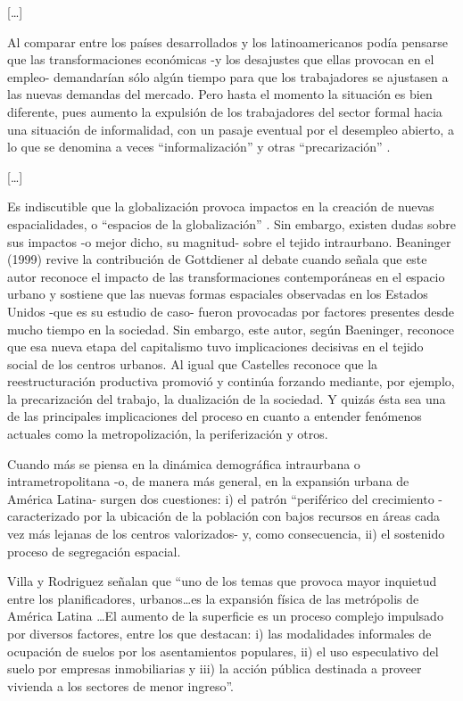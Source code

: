   [\ldots]

  Al comparar entre los países desarrollados y los latinoamericanos podía pensarse que las
  transformaciones económicas -y los desajustes que ellas provocan en el empleo- demandarían sólo
  algún tiempo para que los trabajadores se ajustasen a las nuevas demandas del mercado. Pero hasta el
  momento la situación es bien diferente, pues aumento la expulsión de los trabajadores del sector
  formal hacia una situación de informalidad, con un pasaje eventual por el desempleo abierto, a lo
  que se denomina a veces ``informalización'' y otras ``precarización'' \cite{Ded99}.

  [\ldots]

  Es indiscutible que la globalización provoca impactos en la creación de nuevas espacialidades, o
  ``espacios de la globalización'' \cite{Bae99}. Sin embargo, existen dudas sobre sus impactos -o
  mejor dicho, su magnitud- sobre el tejido intraurbano. Beaninger (1999) revive la contribución de
  Gottdiener al debate cuando señala que este autor reconoce el impacto de las transformaciones
  contemporáneas en el espacio urbano y sostiene que las nuevas formas espaciales observadas en los
  Estados Unidos -que es su estudio de caso- fueron provocadas por factores presentes desde mucho
  tiempo en la sociedad. Sin embargo, este autor, según Baeninger, reconoce que esa nueva etapa del
  capitalismo tuvo implicaciones decisivas en el tejido social de los centros urbanos. Al igual que
  Castelles \cite{Cas89} reconoce que la reestructuración productiva promovió y continúa forzando mediante,
  por ejemplo, la precarización del trabajo, la dualización de la sociedad. Y quizás ésta sea una de
  las principales implicaciones del proceso en cuanto a entender fenómenos actuales como la
  metropolización, la periferización y otros.

  Cuando más se piensa en la dinámica demográfica intraurbana o intrametropolitana -o, de manera más
  general, en la expansión urbana de América Latina- surgen dos cuestiones: i) el patrón ``periférico
  del crecimiento -caracterizado por la ubicación de la población con bajos recursos en áreas cada vez
  más lejanas de los centros valorizados- y, como consecuencia, ii) el sostenido proceso de
  segregación espacial.

  Villa y Rodriguez \cite{Rod97} señalan que ``uno de los temas que provoca mayor inquietud entre los
  planificadores, urbanos\ldots es la expansión física de las metrópolis de América Latina \ldots El
  aumento de la superficie es un proceso complejo impulsado por diversos factores, entre los que
  destacan: i) las modalidades informales de ocupación de suelos por los asentamientos populares, ii)
  el uso especulativo del suelo por empresas inmobiliarias y iii) la acción pública destinada a
  proveer vivienda a los sectores de menor ingreso''.

